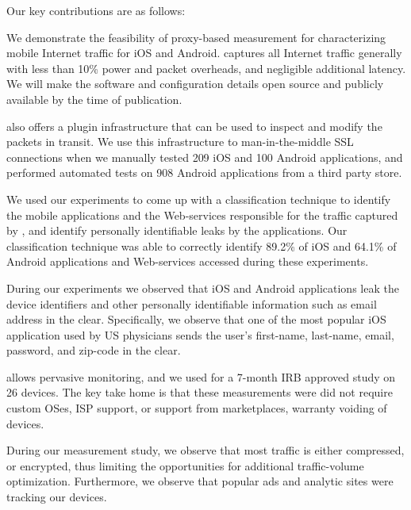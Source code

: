 Our key contributions are as follows:
\begin{packeditemize}
\item We demonstrate the feasibility of proxy-based measurement for characterizing mobile Internet traffic for iOS and Android. 
\platname captures all Internet traffic generally with less than 10\% power and packet overheads, and negligible additional latency. 
We will make the \platname software and configuration details open source and publicly available by the time of publication.
\item \platname also offers a plugin infrastructure that can be used to inspect and modify the packets in transit. We use this infrastructure to man-in-the-middle SSL connections when we manually tested 209 iOS and 100 Android applications, and performed automated tests on 908 Android applications from a third party store. 
\item We used our experiments to come up with a classification technique to identify the mobile applications and the Web-services responsible for the traffic captured by \platname, and identify personally identifiable leaks by the applications. Our classification technique was able to correctly identify 89.2\% of iOS and 64.1\% of Android applications and Web-services accessed during these experiments. 
\item During our experiments we observed that iOS and Android applications leak the device identifiers and other personally identifiable information such as email address in the clear. Specifically, we observe that one of the most popular iOS application used by US physicians sends the user's first-name, last-name, email, password, and zip-code in the clear. 
\item \platname allows pervasive monitoring, and we used \platname for a 7-month IRB approved study on 26 devices. The key take home is that these measurements were did not require custom OSes, ISP support, or support from marketplaces, warranty voiding of devices. 
\item During our measurement study, we observe that most traffic is either compressed, or encrypted, thus limiting the opportunities for additional traffic-volume optimization. Furthermore, we observe that popular ads and analytic sites were tracking our devices.
\end{packeditemize}
